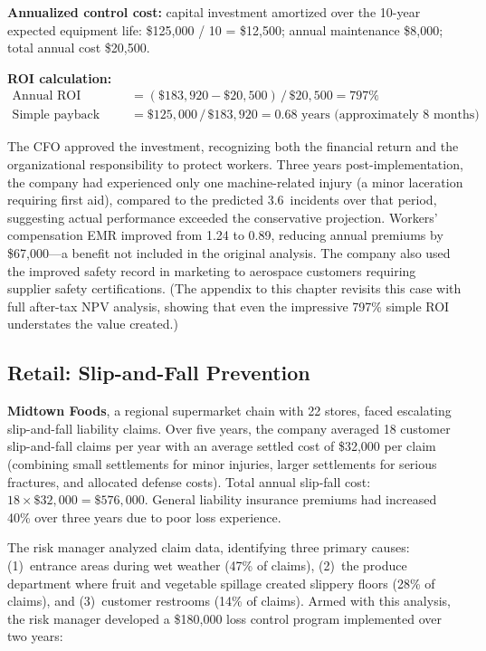 \documentclass[11pt,openany]{book}
\begin{document}
\textbf{Annualized control cost:} capital investment amortized over the
10-year expected equipment life: \$125{,}000 / 10 = \$12{,}500; annual
maintenance \$8{,}000; total annual cost \$20{,}500.

\textbf{ROI calculation:}
\begin{align*}
\text{Annual ROI} &= (\$183{,}920 - \$20{,}500)\,/\,\$20{,}500 = 797\% \\
\text{Simple payback period} &= \$125{,}000\,/\,\$183{,}920 = 0.68
  \text{ years (approximately 8 months)}
\end{align*}

The CFO approved the investment, recognizing both the financial return and the
organizational responsibility to protect workers. Three years
post-implementation, the company had experienced only one machine-related
injury (a minor laceration requiring first aid), compared to the predicted
3.6~incidents over that period, suggesting actual performance exceeded the
conservative projection. Workers' compensation EMR improved from 1.24 to 0.89,
reducing annual premiums by \$67{,}000---a benefit not included in the
original analysis. The company also used the improved safety record in
marketing to aerospace customers requiring supplier safety certifications.
(The appendix to this chapter revisits this case with full after-tax NPV
analysis, showing that even the impressive 797\% simple ROI understates the
value created.)

\subsection{Retail: Slip-and-Fall Prevention}
\label{subsec:midtown}

\textbf{Midtown Foods}, a regional supermarket chain with 22 stores, faced
escalating slip-and-fall liability claims. Over five years, the company
averaged 18 customer slip-and-fall claims per year with an average settled
cost of \$32{,}000 per claim (combining small settlements for minor injuries,
larger settlements for serious fractures, and allocated defense costs). Total
annual slip-fall cost: \(18 \times \$32{,}000 = \$576{,}000\). General
liability insurance premiums had increased 40\% over three years due to poor
loss experience.

The risk manager analyzed claim data, identifying three primary causes:
(1)~entrance areas during wet weather (47\% of claims), (2)~the produce
department where fruit and vegetable spillage created slippery floors (28\% of
claims), and (3)~customer restrooms (14\% of claims). Armed with this
analysis, the risk manager developed a \$180{,}000 loss control program
implemented over two years:
\end{document}
